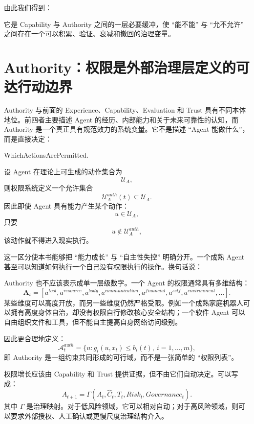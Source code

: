 由此我们得到：
\begin{statementbox}
\centering
{}
\end{statementbox}
它是 Capability 与 Authority 之间的一层必要缓冲，使 ``能不能'' 与 ``允不允许'' 之间存在一个可以积累、验证、衰减和撤回的治理变量。

\section{Authority：权限是外部治理层定义的可达行动边界}

Authority 与前面的 Experience、Capability、Evaluation 和 Trust 具有不同本体地位。前四者主要描述 Agent 的经历、内部能力和关于未来可靠性的认知，而 Authority 是一个真正具有规范效力的系统变量。它不是描述 ``Agent 能做什么''，而是直接决定：
\begin{statementbox}
WhichActionsArePermitted.
\end{statementbox}

设 Agent 在理论上可生成的动作集合为
\[
\mathcal U_A,
\]
则权限系统定义一个允许集合
\[
\mathcal U_A^{auth}(t)
\subseteq
\mathcal U_A.
\]
因此即使 Agent 具有能力产生某个动作：
\[
u\in\mathcal U_A,
\]
只要
\[
u\notin
\mathcal U_A^{auth},
\]
该动作就不得进入现实执行。

这一区分使本书能够把 ``能力成长'' 与 ``自主性失控'' 明确分开。一个成熟 Agent 甚至可以知道如何执行一个自己没有权限执行的操作。换句话说：
\begin{statementbox}
\centering
{}
\end{statementbox}

Authority 也不应该表示成单一层级数字。一个 Agent 的权限通常具有多维结构：
\[
\mathbf A_t
=
[
a^{tool},
a^{resource},
a^{body},
a^{communication},
a^{financial},
a^{self},
a^{environment},
\ldots
].
\]
某些维度可以高度开放，而另一些维度仍然严格受限。例如一个成熟家庭机器人可以拥有高度身体自治，却没有权限自行修改核心安全结构；一个软件 Agent 可以自由组织文件和工具，但不能自主提高自身网络访问级别。

因此更合理地定义：
\[
\mathcal A^{auth}_t
=
\{
u:
g_i(u,x_t)\leq b_i(t),
\ i=1,\ldots,m
\},
\]
即 Authority 是一组约束共同形成的可行域，而不是一张简单的 ``权限列表''。

权限增长应该由 Capability 和 Trust 提供证据，但不由它们自动决定。可以写成：
\[
A_{t+1}
=
\Gamma
\left(
A_t,
\hat C_t,
T_t,
Risk_t,
Governance_t
\right).
\]
其中 $\Gamma$ 是治理映射。对于低风险领域，它可以相对自动；对于高风险领域，则可以要求外部授权、人工确认或更慢尺度治理结构介入。

